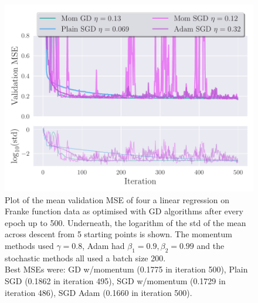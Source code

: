         \begin{figure}[ht!]
            \centering
            \includegraphics[width=\linewidth]{figs/GD_history.pdf} 
            \caption{Plot of the mean validation MSE of four a linear regression on Franke function data as optimised with GD algorithms after every epoch up to 500. Underneath, the logarithm of the std of the mean across descent from 5 starting points is shown. The momentum methods used $\gamma=0.8$, Adam had $\beta_1=0.9, \beta_2=0.99$ and the stochastic methods all used a batch size 200.\\
            Best MSEs were: GD w/momentum (0.1775 in iteration 500), Plain SGD (0.1862 in iteration 495), SGD w/momentum (0.1729 in iteration 486), SGD Adam (0.1660 in iteration 500).}
            \label{res:fig:GD_history}           
        \end{figure}

